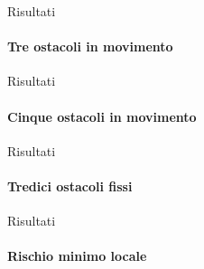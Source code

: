 \documentclass[handout]{beamer}
\begin{document}
\begin{frame}{Risultati}
\framesubtitle{Tre ostacoli in movimento}
\centering
\graphicspath{ {../simulazioni/treostacoli1} }
\end{frame}

\begin{frame}{Risultati}
\framesubtitle{Cinque ostacoli in movimento}
\centering
\graphicspath{ {../simulazioni/treostacoli1} }
\end{frame}

\begin{frame}{Risultati}
\framesubtitle{Tredici ostacoli fissi}
\centering
\graphicspath{ {../simulazioni/moltiostacoli} }
\end{frame}

\begin{frame}{Risultati}
\framesubtitle{Rischio minimo locale}
\centering
\graphicspath{ {../simulazioni/treostacoli1} }
\end{frame}
\end{document}
